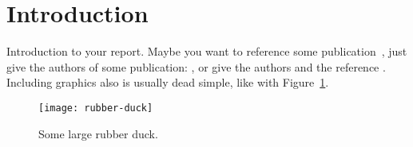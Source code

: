 \section{Introduction} \label{introduction}

Introduction to your report. Maybe you want to reference some publication~\cite{croft:2009}, just give the authors of some publication: \citeauthor{croft:2009}, or give the authors and the reference \citet{croft:2009}. Including graphics also is usually dead simple, like with Figure~\ref{rubber-duck}.

\begin{figure}[b]
    \centering
    \texttt{[image: rubber-duck]}
    \caption{Some large rubber duck.}
    \label{rubber-duck}
\end{figure}

